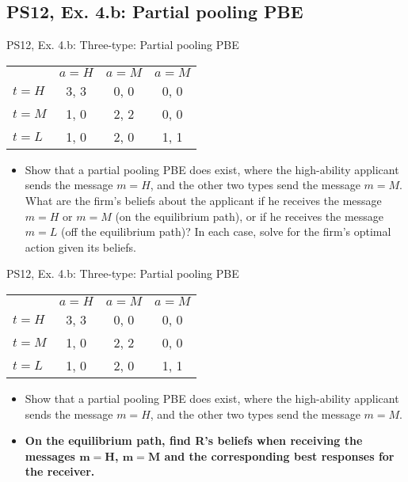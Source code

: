 \subsection{PS12, Ex. 4.b: Partial pooling PBE}

\begin{frame}{PS12, Ex. 4.b: Three-type: Partial pooling PBE}
    \begin{table}
      \begin{tabular}{l|c|c|c|}
          \multicolumn{1}{c}{} & \multicolumn{1}{c}{$a=H$} & \multicolumn{1}{c}{$a=M$} & \multicolumn{1}{c}{$a=M$} \\\cline{2-4}
          $t=H$ & 3, 3 & 0, 0 & 0, 0 \\\cline{2-4}
          $t=M$ & 1, 0 & 2, 2 & 0, 0 \\\cline{2-4}
          $t=L$ & 1, 0 & 2, 0 & 1, 1 \\\cline{2-4}
      \end{tabular}
    \end{table}\vspace{-8pt}
    \begin{itemize}
      \item[(b)] Show that a partial pooling PBE does exist, where the high-ability applicant sends the message $m = H$, and the other two types send the message $m = M$. What are the firm’s beliefs about the applicant if he receives the message $m = H$ or $m = M$ (on the equilibrium path), or if he receives the message $m = L$ (off the equilibrium path)? In each case, solve for the firm’s optimal action given its beliefs.
    \end{itemize}\vspace{-6pt}
    \vfill\null
\end{frame}
\begin{frame}{PS12, Ex. 4.b: Three-type: Partial pooling PBE}
    \begin{table}
      \begin{tabular}{l|c|c|c|}
          \multicolumn{1}{c}{} & \multicolumn{1}{c}{$a=H$} & \multicolumn{1}{c}{$a=M$} & \multicolumn{1}{c}{$a=M$} \\\cline{2-4}
          $t=H$ & 3, 3 & 0, 0 & 0, 0 \\\cline{2-4}
          $t=M$ & 1, 0 & 2, 2 & 0, 0 \\\cline{2-4}
          $t=L$ & 1, 0 & 2, 0 & 1, 1 \\\cline{2-4}
      \end{tabular}
    \end{table}\vspace{-8pt}
    \begin{itemize}
      \item[(b)] Show that a partial pooling PBE does exist, where the high-ability applicant sends the message $m = H$, and the other two types send the message $m = M$.
      \item[Step 1:] \textbf{On the equilibrium path, find R's beliefs when receiving the messages $\bm{m=H}$, $\bm{m=M}$ and the corresponding best responses for the receiver.}
    \end{itemize}\vspace{-6pt}
    \vfill\null
\end{frame}
